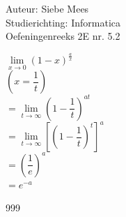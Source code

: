 \documentclass[a4paper]{article}
\begin{document}
  
\noindent \large Auteur: Siebe Mees \\
\noindent \large Studierichting: Informatica \\
\noindent \large Oefeningenreeks 2E nr. 5.2 \\

\medskip

\normalsize

$ \lim\limits_{x \rightarrow 0} \left(1 - x\right)^{\tfrac{a}{x}} $ \\

$\left( x = \dfrac{1}{t} \right) $ \\

$ = \lim\limits_{t \rightarrow \infty} \left(1-\dfrac{1}{t}\right)^{at} $ \\

$ = \lim\limits_{t \rightarrow \infty} \left[ \left(1-\dfrac{1}{t}\right)^t \right]^{a} $ \\

$ = \left( \dfrac{1}{e} \right)^a $ \\

$= e^{-a} $

\begin{thebibliography}{999}
\end{thebibliography}
\end{document}
